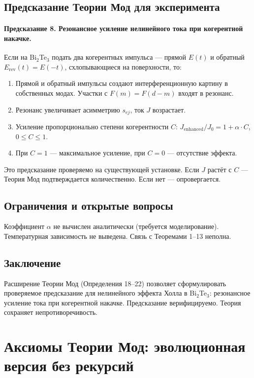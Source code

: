 \documentclass[12pt,a4paper]{article}
\begin{document}
\subsection{Предсказание Теории Мод для эксперимента}

\paragraph{Предсказание 8. Резонансное усиление нелинейного тока при когерентной накачке.}
Если на Bi$_2$Te$_3$ подать два когерентных импульса --- прямой $E(t)$ и обратный $E_{\text{rev}}(t) = E(-t)$, схлопывающиеся на поверхности, то:
\begin{enumerate}
    \item Прямой и обратный импульсы создают интерференционную картину в собственных модах. Участки с $F(m) = F(d-m)$ входят в резонанс.
    \item Резонанс увеличивает асимметрию $s_{ej}$, ток $J$ возрастает.
    \item Усиление пропорционально степени когерентности $C$: $J_{\text{enhanced}}/J_0 = 1 + \alpha \cdot C$, $0 \le C \le 1$.
    \item При $C=1$ --- максимальное усиление, при $C=0$ --- отсутствие эффекта.
\end{enumerate}

Это предсказание проверяемо на существующей установке. Если $J$ растёт с $C$ --- Теория Мод подтверждается количественно. Если нет --- опровергается.

\subsection{Ограничения и открытые вопросы}
Коэффициент $\alpha$ не вычислен аналитически (требуется моделирование). Температурная зависимость не выведена. Связь с Теоремами 1--13 неполна.

\subsection{Заключение}
Расширение Теории Мод (Определения 18--22) позволяет сформулировать проверяемое предсказание для нелинейного эффекта Холла в Bi$_2$Te$_3$: резонансное усиление тока при когерентной накачке. Предсказание верифицируемо. Теория сохраняет непротиворечивость.

\newpage
\section{Аксиомы Теории Мод: эволюционная версия без рекурсий}
\end{document}

